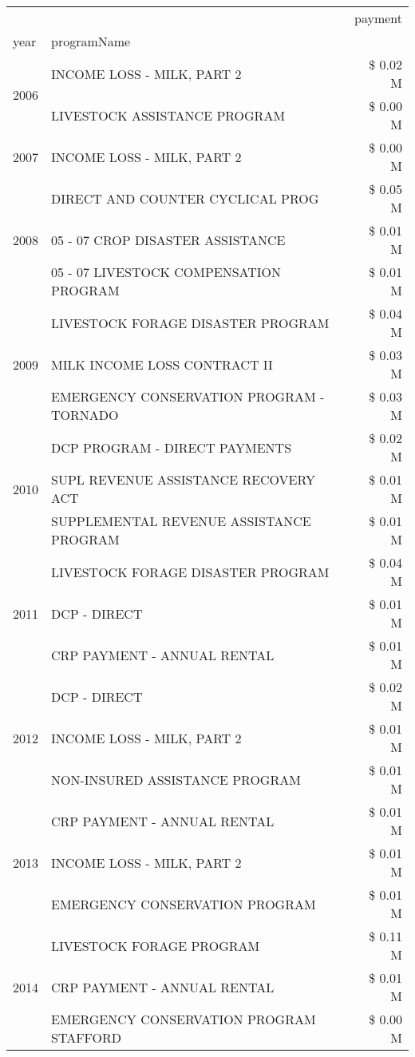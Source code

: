 \begin{tabular}{llr}
\toprule
 &  & payment \\
year & programName &  \\
\midrule
\multirow[t]{2}{*}{2006} & INCOME LOSS - MILK, PART 2 & \$ 0.02 M \\
 & LIVESTOCK ASSISTANCE PROGRAM & \$ 0.00 M \\
\cline{1-3}
2007 & INCOME LOSS - MILK, PART 2 & \$ 0.00 M \\
\cline{1-3}
\multirow[t]{3}{*}{2008} & DIRECT AND COUNTER CYCLICAL PROG & \$ 0.05 M \\
 & 05 - 07 CROP DISASTER ASSISTANCE & \$ 0.01 M \\
 & 05 - 07 LIVESTOCK COMPENSATION PROGRAM & \$ 0.01 M \\
\cline{1-3}
\multirow[t]{3}{*}{2009} & LIVESTOCK FORAGE DISASTER  PROGRAM & \$ 0.04 M \\
 & MILK INCOME LOSS CONTRACT II & \$ 0.03 M \\
 & EMERGENCY CONSERVATION PROGRAM - TORNADO & \$ 0.03 M \\
\cline{1-3}
\multirow[t]{3}{*}{2010} & DCP PROGRAM - DIRECT PAYMENTS & \$ 0.02 M \\
 & SUPL REVENUE ASSISTANCE RECOVERY ACT & \$ 0.01 M \\
 & SUPPLEMENTAL REVENUE ASSISTANCE PROGRAM & \$ 0.01 M \\
\cline{1-3}
\multirow[t]{3}{*}{2011} & LIVESTOCK FORAGE DISASTER PROGRAM & \$ 0.04 M \\
 & DCP - DIRECT & \$ 0.01 M \\
 & CRP PAYMENT - ANNUAL RENTAL & \$ 0.01 M \\
\cline{1-3}
\multirow[t]{3}{*}{2012} & DCP - DIRECT & \$ 0.02 M \\
 & INCOME LOSS - MILK, PART 2 & \$ 0.01 M \\
 & NON-INSURED ASSISTANCE PROGRAM & \$ 0.01 M \\
\cline{1-3}
\multirow[t]{3}{*}{2013} & CRP PAYMENT - ANNUAL RENTAL & \$ 0.01 M \\
 & INCOME LOSS - MILK, PART 2 & \$ 0.01 M \\
 & EMERGENCY CONSERVATION PROGRAM & \$ 0.01 M \\
\cline{1-3}
\multirow[t]{3}{*}{2014} & LIVESTOCK FORAGE PROGRAM & \$ 0.11 M \\
 & CRP PAYMENT - ANNUAL RENTAL & \$ 0.01 M \\
 & EMERGENCY CONSERVATION PROGRAM STAFFORD & \$ 0.00 M \\

\end{tabular}
